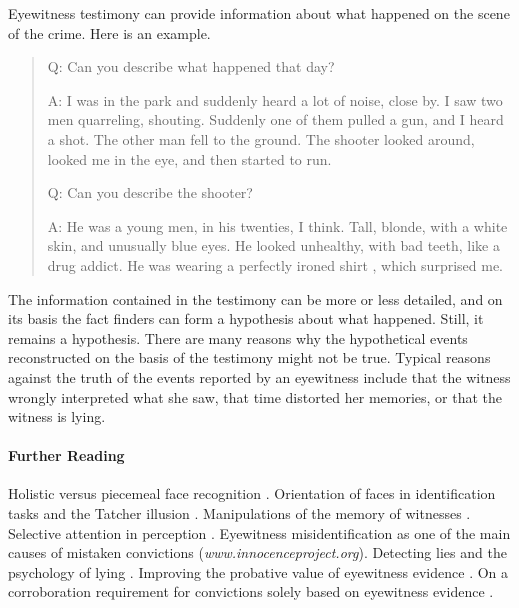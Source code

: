 \documentclass[10pt]{article}
\begin{document}
Eyewitness testimony can provide information about what 
happened on the scene of the crime. Here is an example.
%
\begin{quote}
Q: Can you describe what happened that day?

A: I was in the park and suddenly heard a lot of noise, close by. I saw two men quarreling, shouting. Suddenly one of them pulled a gun, 
and I heard a shot. The other man fell to the ground. The shooter looked around, looked me in the eye, and then started to run.

Q: Can you describe the shooter?

A: He was a young men, in his twenties, I think. Tall, blonde, with a white skin, and unusually blue eyes. 
He looked unhealthy, with bad teeth, 
like a drug addict. He was wearing a perfectly ironed  shirt%
, which surprised me. %
\end{quote}
%
The information contained in the testimony can be 
more or less detailed, and on its basis the fact finders
can form a hypothesis about what happened. 
Still, it remains a hypothesis. There are many reasons why the hypothetical events reconstructed on the basis of the testimony might not be true. Typical reasons against the truth of the events reported by an eyewitness include that the witness wrongly interpreted what she saw, that time distorted her memories, or that the witness is lying. 

\paragraph{Further Reading}

Holistic versus 
piecemeal face recognition \citep{tanakaEtAl1993}.
Orientation of faces in identification tasks and 
the Tatcher illusion \citep{thomson1980}.
Manipulations of the memory of witnesses \citep{loftus1996}. Selective attention in perception \citep{simonsEtAl1999}.
Eyewitness misidentification as one 
of the main causes of mistaken convictions (\textit{www.innocenceproject.org}).
Detecting lies and the psychology of lying \citep{vrij2008}.
Improving the probative value of eyewitness evidence \citep{wellsEtAl2006}.
 On a corroboration requirement for convictions solely based on eyewitness evidence
 \citep{thomson08, crump09}.
\end{document}
